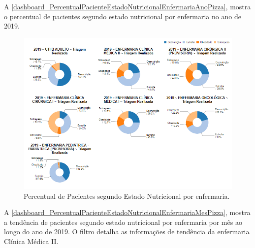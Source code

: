 \newpage
A \autoref{dashboard_PercentualPacienteEstadoNutricionalEnfermariaAnoPizza}, mostra o percentual de pacientes segundo estado nutricional por enfermaria no ano de 2019.

\begin{figure}[htb]
	\caption{\label{dashboard_PercentualPacienteEstadoNutricionalEnfermariaAnoPizza}Percentual de Pacientes segundo Estado Nutricional por enfermaria.}
	\begin{center}
	    \includegraphics[scale=0.6]{Imagens/3.3.PercentualPacienteEstadoNutricionalEnfermariaAnoPizza.png}
	\end{center}
\end{figure}

\newpage
A \autoref{dashboard_PercentualPacienteEstadoNutricionalEnfermariaMesPizza}, mostra a tendência de pacientes segundo estado nutricional por enfermaria por mês ao longo do ano de 2019. O filtro detalha as informações de tendência da enfermaria Clínica Médica II.

